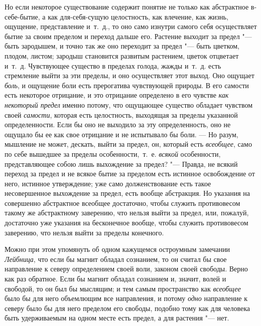 Но если некоторое существование содержит понятие не только как абстрактное
в-себе-бытие, а как для-себя-сущую целостность, как влечение, как жизнь,
ощущение, представление и~т.~д., то оно само изнутри самого себя
осуществляет бытие за своим пределом и переход дальше его. Растение выходит
за предел "--- быть зародышем, и точно так же оно переходит за предел "--- быть
цветком, плодом, листом; зародыш становится развитым растением, цветок
отцветает и~т.~д. Чувствующее существо в пределах голода, жажды и~т.~д.
есть стремление выйти за эти пределы, и оно осуществляет этот выход. Оно
ощущает {\em боль}, и ощущение боли есть прерогатива
чувствующей природы. В его самости есть некоторое отрицание, и это
отрицание определено в его чувстве {\em как некоторый
предел} именно потому, что ощущающее существо обладает чувством своей
{\em самости}, которая есть целостность, выходящая за
пределы указанной определенности. Если бы оно не выходило за эту
определенность, оно не ощущало бы ее как свое отрицание и не испытывало бы
боли. — Но разум, мышление не может, дескать, выйти за предел, он, который
есть {\em всеобщее}, само по себе вышедшее за пределы
особенности,~т.~е. {\em всякой} особенности,
представляющее собою лишь выхождение за предел? "--- Правда, не всякий переход
за предел и не всякое бытие за пределом есть истинное освобождение от него,
истинное утверждение; уже само долженствование есть такое несовершенное
выхождение за предел, есть вообще абстракция. Но указания на совершенно
абстрактное всеобщее достаточно, чтобы служить противовесом такому же
абстрактному заверению, что нельзя выйти за предел, или, пожалуй,
достаточно уже указания на бесконечное вообще, чтобы служить противовесом
заверению, что нельзя выйти за пределы конечного.

Можно при этом упомянуть об одном кажущемся остроумным замечании
{\em Лейбница}, что если бы магнит обладал сознанием,
то он считал бы свое направление к северу определением своей воли, законом
своей свободы. Верно как раз
обратное. Если бы магнит обладал сознанием и, значит, волей и свободой, то
он был бы мыслящим; и тем самым пространство как
{\em всеобщее} было бы для него объемлющим все
направления, и потому {\em одно} направление к северу
было бы для него пределом его свободы, подобно тому как для человека быть
удерживаемым на одном месте есть предел, а для растения "--- нет.

